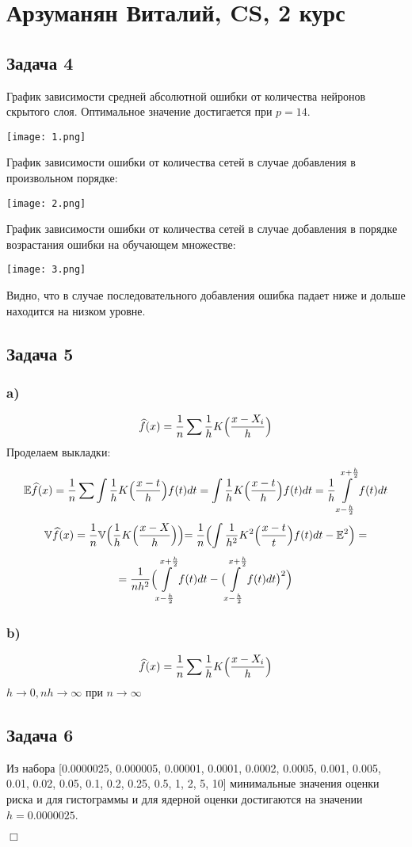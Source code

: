 \documentclass[12pt]{article}
\begin{document}
\section*{Арзуманян Виталий, CS, 2 курс}

\subsection*{Задача 4}
График зависимости средней абсолютной ошибки от количества нейронов скрытого слоя. Оптимальное значение достигается при $p=14$.

\texttt{[image: 1.png]}

График зависимости ошибки от количества сетей в случае добавления в произвольном порядке:

\texttt{[image: 2.png]}

График зависимости ошибки от количества сетей в случае добавления в порядке возрастания ошибки на обучающем множестве:

\texttt{[image: 3.png]}

Видно, что в случае последовательного добавления ошибка падает ниже и дольше находится на низком уровне.

\subsection*{Задача 5}
\subsubsection*{a)}
$$\widehat{f}(x) = \frac{1}{n}\sum\frac{1}{h}K\Bigl(\frac{x - X_i}{h}\Bigr)$$
Проделаем выкладки:
$$\mathbb{E}\widehat{f}(x) = \frac{1}{n} \sum \int \frac{1}{h} K\Bigl(\frac{x-t}{h}\Bigr)f(t)dt = \int \frac{1}{h} K \Bigl( \frac{x - t}{h} \Bigr) f(t)dt = \frac{1}{h}\int\limits_{x - \frac{h}{2}}^{x + \frac{h}{2}}f(t)dt$$
$$\mathbb{V}\widehat{f}(x) = \frac{1}{n} \mathbb{V}\Bigl(\frac{1}{h}K\Bigl(\frac{x - X}{h}\Bigl)\Bigl) = \frac{1}{n} \Bigl( \int\frac{1}{h^2} K^2\Bigl(\frac{x - t}{t} \Bigr)f(t)dt - \mathbb{E}^2 \Bigr) =$$
$$= \frac{1}{nh^2} \Bigl( \int\limits_{x - \frac{h}{2}}^{x + \frac{h}{2}} f(t)dt - \bigl( \int\limits_{x - \frac{h}{2}}^{x + \frac{h}{2}} f(t)dt \bigr)^2 \Bigr)$$

\subsubsection*{b)}
$$\widehat{f}(x) = \frac{1}{n}\sum\frac{1}{h}K\Bigl(\frac{x - X_i}{h}\Bigr)$$
$h\to0, nh\to\infty$ при $n\to\infty$




\subsection*{Задача 6}
Из набора [0.0000025, 0.000005, 0.00001, 0.0001, 0.0002, 0.0005, 0.001, 0.005, 0.01, 0.02, 0.05, 0.1, 0.2, 0.25, 0.5, 1, 2, 5, 10] минимальные значения оценки риска и для гистограммы и для ядерной оценки достигаются на значении $h=0.0000025$.


\begin{flushright}
$\Box$
\end{flushright}
\end{document}
